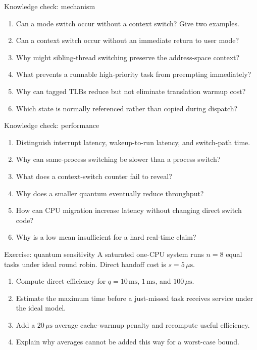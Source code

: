 \documentclass[aspectratio=169,11pt]{beamer}
\begin{document}
\begin{frame}{Knowledge check: mechanism}
  \begin{enumerate}
    \item Can a mode switch occur without a context switch? Give two examples.
    \item Can a context switch occur without an immediate return to user mode?
    \item Why might sibling-thread switching preserve the address-space context?
    \item What prevents a runnable high-priority task from preempting immediately?
    \item Why can tagged TLBs reduce but not eliminate translation warmup cost?
    \item Which state is normally referenced rather than copied during dispatch?
  \end{enumerate}
\end{frame}

\begin{frame}{Knowledge check: performance}
  \begin{enumerate}
    \item Distinguish interrupt latency, wakeup-to-run latency, and switch-path time.
    \item Why can same-process switching be slower than a process switch?
    \item What does a context-switch counter fail to reveal?
    \item Why does a smaller quantum eventually reduce throughput?
    \item How can CPU migration increase latency without changing direct switch code?
    \item Why is a low mean insufficient for a hard real-time claim?
  \end{enumerate}
\end{frame}

\begin{frame}{Exercise: quantum sensitivity}
  A saturated one-CPU system runs $n=8$ equal tasks under ideal round robin. Direct handoff cost is $s=5\,\mu\mathrm{s}$.
  \begin{enumerate}
    \item Compute direct efficiency for $q=10\,\mathrm{ms}$, $1\,\mathrm{ms}$, and $100\,\mu\mathrm{s}$.
    \item Estimate the maximum time before a just-missed task receives service under the ideal model.
    \item Add a $20\,\mu\mathrm{s}$ average cache-warmup penalty and recompute useful efficiency.
    \item Explain why averages cannot be added this way for a worst-case bound.
  \end{enumerate}
\end{frame}
\end{document}
